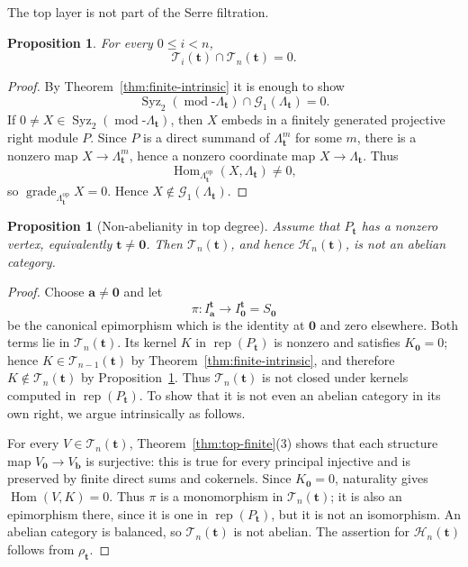 \documentclass[10pt,a4paper]{amsart}
\newtheorem{proposition}[theorem]{Proposition}
\newcommand{\Rep}{\operatorname{rep}}
\newcommand{\Hom}{\operatorname{Hom}}
\newcommand{\grade}{\operatorname{grade}}
\newcommand{\modcat}{\operatorname{mod}}
\begin{document}
The top layer is not part of the Serre filtration.

\begin{proposition}\label{prop:top-disjoint}
For every $0\le i<n$,
\[
\mathcal T_i(\mathbf t)\cap\mathcal T_n(\mathbf t)=0.
\]
\end{proposition}

\begin{proof}
By Theorem~\ref{thm:finite-intrinsic} it is enough to show
\[
\operatorname{Syz}_2(\modcat\text{-}\Lambda_{\mathbf t})
\cap
\mathcal G_1(\Lambda_{\mathbf t})=0.
\]
If $0\ne X\in\operatorname{Syz}_2(\modcat\text{-}\Lambda_{\mathbf t})$, then $X$ embeds in a finitely generated projective right module $P$.  Since $P$ is a direct summand of $\Lambda_{\mathbf t}^m$ for some $m$, there is a nonzero map $X\to\Lambda_{\mathbf t}^m$, hence a nonzero coordinate map $X\to\Lambda_{\mathbf t}$.  Thus
\[
\Hom_{\Lambda_{\mathbf t}^{\mathrm{op}}}(X,\Lambda_{\mathbf t})\ne0,
\]
so $\grade_{\Lambda_{\mathbf t}^{\mathrm{op}}}X=0$.  Hence $X\notin\mathcal G_1(\Lambda_{\mathbf t})$.
\end{proof}

\begin{proposition}[Non-abelianity in top degree]\label{prop:top-nonabelian}
Assume that $P_{\mathbf t}$ has a nonzero vertex, equivalently
$\mathbf t\ne\mathbf0$.  Then $\mathcal T_n(\mathbf t)$, and hence
$\mathcal H_n(\mathbf t)$, is not an abelian category.
\end{proposition}

\begin{proof}
Choose $\mathbf a\ne\mathbf0$ and let
\[
\pi:I^{\mathbf t}_{\mathbf a}\longrightarrow
I^{\mathbf t}_{\mathbf0}=S_{\mathbf0}
\]
be the canonical epimorphism which is the identity at $\mathbf0$ and zero
elsewhere.  Both terms lie in $\mathcal T_n(\mathbf t)$.  Its kernel $K$ in
$\Rep(P_{\mathbf t})$ is nonzero and satisfies $K_{\mathbf0}=0$; hence
$K\in\mathcal T_{n-1}(\mathbf t)$ by
Theorem~\ref{thm:finite-intrinsic}, and therefore
$K\notin\mathcal T_n(\mathbf t)$ by Proposition~\ref{prop:top-disjoint}.
Thus $\mathcal T_n(\mathbf t)$ is not closed under kernels computed in
$\Rep(P_{\mathbf t})$.  To show that it is not even an abelian category in
its own right, we argue intrinsically as follows.

For every $V\in\mathcal T_n(\mathbf t)$, Theorem~\ref{thm:top-finite}(3)
shows that each structure map $V_{\mathbf0}\to V_{\mathbf b}$ is surjective:
this is true for every principal injective and is preserved by finite direct
sums and cokernels.  Since $K_{\mathbf0}=0$, naturality gives
$\Hom(V,K)=0$.  Thus $\pi$ is a monomorphism in
$\mathcal T_n(\mathbf t)$; it is also an epimorphism there, since it is one in
$\Rep(P_{\mathbf t})$, but it is not an isomorphism.  An abelian category is
balanced, so $\mathcal T_n(\mathbf t)$ is not abelian.  The assertion for
$\mathcal H_n(\mathbf t)$ follows from $\rho_{\mathbf t}$.
\end{proof}
\end{document}
